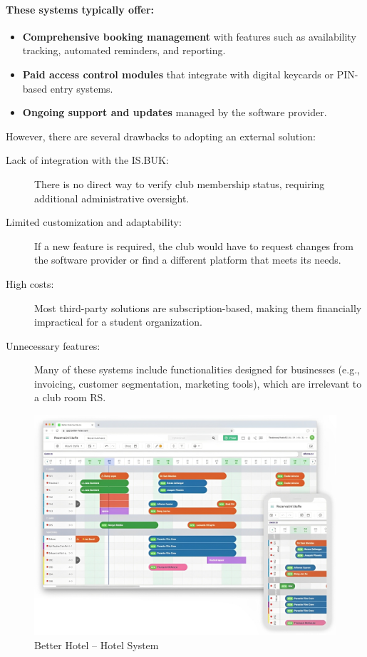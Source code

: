 \paragraph{These systems typically offer:}

\begin{itemize}
  \item \textbf{Comprehensive booking management} with features such as availability tracking, automated reminders, and reporting.
  \item \textbf{Paid access control modules} that integrate with digital keycards or PIN-based entry systems.
  \item \textbf{Ongoing support and updates} managed by the software provider.
\end{itemize}

However, there are several drawbacks to adopting an external solution:

\begin{description}
  \item [Lack of integration with the IS.BUK:] There is no direct way to verify club membership status, requiring additional administrative oversight.
  \item [Limited customization and adaptability:] If a new feature is required, the club would have to request changes from the software provider or find a different platform that meets its needs.
  \item [High costs:] Most third-party solutions are subscription-based, making them financially impractical for a student organization.
  \item [Unnecessary features:] Many of these systems include functionalities designed for businesses (e.g., invoicing, customer segmentation, marketing tools), which are irrelevant to a club room RS.
\end{description}

\begin{figure}[!htbp]
  \centering
  \includegraphics[width=\linewidth]{images/better-hotel}
  \caption{Better Hotel -- Hotel System~\cite{BetterHotel}}
  \label{fig:BetterHotel}
\end{figure}

